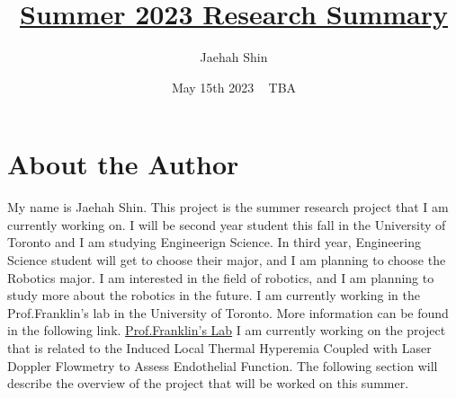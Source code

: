 \documentclass{article}
\title{\underline {\textbf{Summer 2023 Research Summary}}}
\author{Jaehah Shin}
\date{May 15th 2023 ~ TBA}
\begin{document}
\maketitle
\tableofcontents
\section{About the Author}
\quad
My name is Jaehah Shin.
This project is the summer research project that I am currently working on.
I will be second year student this fall in the University of Toronto and I am studying Engineerign Science.
In third year, Engineering Science student will get to choose their major, and I am planning to choose the Robotics major.
I am interested in the field of robotics, and I am planning to study more about the robotics in the future.
I am currently working in the Prof.Franklin's lab in the University of Toronto. 
More information can be found in the following link. \href{https://franklinresearch.ca}{Prof.Franklin's Lab} 
I am currently working on the project that is related to the Induced Local Thermal Hyperemia Coupled with Laser Doppler Flowmetry to Assess Endothelial Function.
The following section will describe the overview of the project that will be worked on this summer. 
\end{document}
